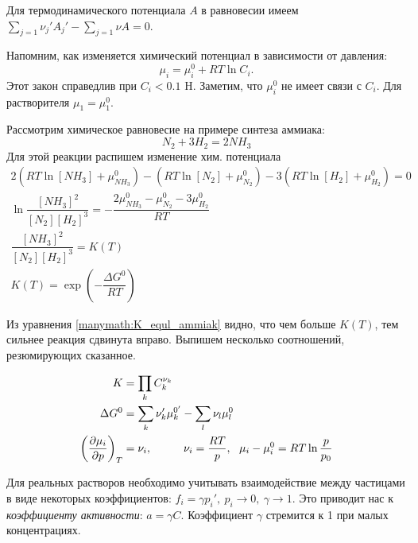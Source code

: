 
\begin{lecture}
	\begin{lecSection}
	Для термодинамического потенциала $ A $ в равновесии имеем 
	$ \sum\limits_{j=1} \nu_j' A_j' - \sum\limits_{j=1} \nu A = 0 $.
	
	Напомним, как изменяется химический потенциал в зависимости от давления:
	\begin{equation}
		\mu_i = \mu_i^0 + RT \ln C_i.
		\label{eq:mu_from_C}
	\end{equation}
	Этот закон справедлив при $ C_i < 0.1 \text{ H} $. Заметим, что $ \mu_i^0 $ не имеет связи с $ C_i $.
	Для растворителя $ \mu_1 = \mu_1^0 $. 
	
	Рассмотрим химическое равновесие на примере синтеза аммиака:
	\begin{equation}
		N_2 + 3 H_2 = 2 NH_3
		\label{chem_eq:ammiak_equil}
	\end{equation}
	Для этой реакции распишем изменение хим. потенциала
	\begin{gather}
		\nonumber
		 2\left( RT \ln [NH_3] + \mu_{NH_3}^0 \right) 
		-  \left( RT \ln [N_2 ] + \mu_{N_2 }^0 \right)
		- 3\left( RT \ln [H_2 ] + \mu_{H_2}^0  \right)
		= 0 \\
		\nonumber
		\ln \dfrac{[NH_3]^2}{[N_2] [H_2]^3} = 
		-\dfrac{2\mu_{NH_3}^0 - \mu_{N_2}^0 - 3\mu_{H_2}^0}{RT} \\
		\dfrac{[NH_3]^2}{[N_2] [H_2]^3} = K (T)
				\label{manymath:K_equl_ammiak} \\
		\boxed{
			K (T) = \exp\left( -\dfrac{\Delta G^0}{RT} \right)
		} \label{eq:K_from_G}
	\end{gather}
	
	Из уравнения \ref{manymath:K_equl_ammiak} видно, что чем больше $ K(T) $, тем сильнее реакция сдвинута вправо. Выпишем несколько соотношений, резюмирующих сказанное.
	
	\begin{align*}
		& & K &= \prod\limits_{k} C_k^{\nu_k} & & \\
		& & \Delta G^0 &= \sum\limits_{k} \nu_k' \mu_k^{0'}
		- \sum\limits_l \nu_l \mu_l^0 & &  \\
		& & \left( \dfrac{\partial \mu_i}{\partial p} \right)_T &= \nu_i, \hspace*{1cm}  \nu_i = \dfrac{RT}{p}, ~~ \mu_i - \mu_i^0 = RT \ln \dfrac{p}{p_0}
	\end{align*}
	
	Для реальных растворов необходимо учитывать взаимодействие между частицами в виде некоторых коэффициентов: $ f_i = \gamma p_i', ~ p_i \rightarrow 0, ~\gamma \rightarrow 1 $. Это приводит нас к \textit{коэффициенту активности}: $ a = \gamma C $. Коэффициент $ \gamma $ стремится к 1 при малых концентрациях.
	

\end{lecSection}
\end{lecture}
